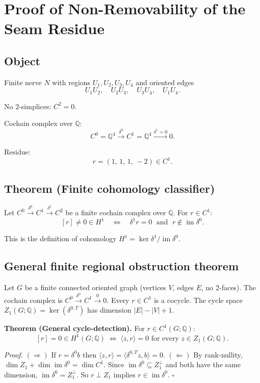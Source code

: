 \section{Proof of Non-Removability of the Seam Residue}

\subsection*{Object}
Finite nerve $N$ with regions $U_1, U_2, U_3, U_4$ and oriented edges
\[
U_1U_2,\quad U_2U_3,\quad U_3U_4,\quad U_1U_4.
\]

No 2-simplices: $C^2 = 0$.

Cochain complex over $\mathbb{Q}$:
\[
C^0 = \mathbb{Q}^4
\xrightarrow{\delta^0}
C^1 = \mathbb{Q}^4
\xrightarrow{\delta^1 = 0}
0.
\]

Residue:
\[
r = (1,\,1,\,1,\,-2) \in C^1.
\]

\subsection*{Theorem (Finite cohomology classifier)}
Let $C^0 \xrightarrow{\delta^0} C^1 \xrightarrow{\delta^1} C^2$ be a finite cochain complex over $\mathbb{Q}$. For $r \in C^1$:
\[
[r] \neq 0 \in H^1
\quad\Longleftrightarrow\quad
\delta^1 r = 0
\;\text{ and }\;
r \notin \operatorname{im}\delta^0.
\]

This is the definition of cohomology $H^1 = \ker\delta^1 / \operatorname{im}\delta^0$.

\subsection{General finite regional obstruction theorem}

Let $G$ be a finite connected oriented graph (vertices $V$, edges $E$, no
2-faces). The cochain complex is $C^0\xrightarrow{\delta^0}C^1\xrightarrow{0}0$.
Every $r\in C^1$ is a cocycle. The cycle space $Z_1(G;\mathbb{Q})=\ker(\delta^{0,T})$
has dimension $|E|-|V|+1$.

\textbf{Theorem (General cycle-detection).}
For $r\in C^1(G;\mathbb{Q})$:
\[
[r]=0\in H^1(G;\mathbb{Q})
\;\Longleftrightarrow\;
\langle z,r\rangle=0 \text{ for every } z\in Z_1(G;\mathbb{Q}).
\]

\textit{Proof.}
$(\Rightarrow)$ If $r=\delta^0 b$ then $\langle z,r\rangle=\langle\delta^{0,T}z,b\rangle=0$.
$(\Leftarrow)$ By rank-nullity, $\dim Z_1+\dim\operatorname{im}\delta^0=\dim C^1$.
Since $\operatorname{im}\delta^0\subseteq Z_1^\perp$ and both have the same dimension,
$\operatorname{im}\delta^0=Z_1^\perp$. So $r\perp Z_1$ implies $r\in\operatorname{im}\delta^0$.
$\square$

